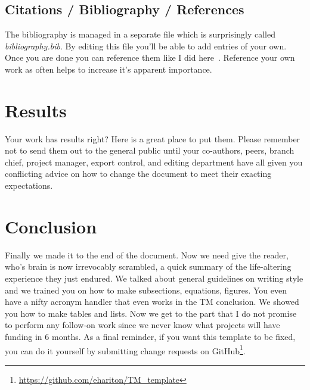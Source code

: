 \documentclass[]{NASA}
\begin{document}
\begin{flushleft}
\subsection{Citations / Bibliography / References}
\label{sec:citations}
The bibliography is managed in a separate file which is surprisingly called \emph{bibliography.bib}. By editing this file you'll be able to add entries of your own. Once you are done you can reference them like I did here~\cite{Aretskin2019}. Reference your own work as often helps to increase it's apparent importance.



\section{Results}
\label{sec:results}
Your work has results right? Here is a great place to put them. Please remember not to send them out to the general public until your co-authors, peers, branch chief, project manager, export control, and editing department have all given you conflicting advice on how to change the document to meet their exacting expectations. 





\acresetall         %
\section{Conclusion} 
\label{sec:Conclusion}
Finally we made it to the end of the document. Now we need give the reader, who's brain is now irrevocably scrambled, a quick summary of the life-altering experience they just endured. We talked about general guidelines on writing style and we trained you on how to make subsections, equations, figures. You even have a nifty acronym handler that even works in the \ac{TM} conclusion. We showed you how to make tables and lists. 
Now we get to the part that I do not promise to perform any follow-on work since we never know what projects will have funding in 6 months.
As a final reminder, if you want this template to be fixed, you can do it yourself by submitting change requests on GitHub\footnote{\url{https://github.com/ehariton/TM_template}}.



\end{flushleft} %
\end{document}
